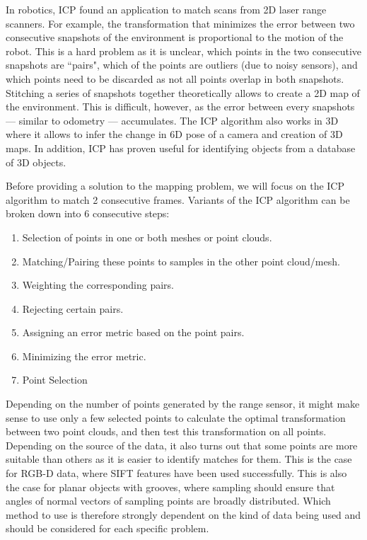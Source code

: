 \documentclass[paper=6.14in:9.21in,pagesize=pdftex,11pt,twoside,openright]{scrbook}
\begin{document}
In robotics, ICP found an application to match scans from 2D laser range scanners. For example, the transformation that minimizes the error between two consecutive snapshots of the environment is proportional to the motion of the robot. This is a hard problem as it is unclear, which points in the two consecutive snapshots are ``pairs", which of the points are outliers (due to noisy sensors), and which points need to be discarded as not all points overlap in both snapshots. Stitching a series of snapshots together theoretically allows to create a 2D map of the environment. This is difficult, however, as the error between every snapshots --- similar to odometry --- accumulates.   The ICP algorithm also works in 3D where it allows to infer the change in 6D pose of a camera and creation of 3D maps. In addition, ICP has proven useful for identifying objects from a database of 3D objects.

Before providing a solution to the mapping problem, we will focus on the ICP algorithm to match 2 consecutive frames. Variants of the ICP algorithm can be broken down into 6 consecutive steps:
\begin{enumerate}
\item Selection of points in one or both meshes or point clouds.
\item Matching/Pairing these points to samples in the other point cloud/mesh.
\item Weighting the corresponding pairs.
\item Rejecting certain pairs.
\item Assigning an error metric based on the point pairs.
\item Minimizing the error metric.
\item Point Selection
\end{enumerate}
Depending on the number of points generated by the range sensor, it might make sense to use only a few selected points to calculate the optimal transformation between two point clouds, and then test this transformation on all points. Depending on the source of the data, it also turns out that some points are more suitable than others as it is easier to identify matches for them. This is the case for RGB-D data, where SIFT features have been used successfully. This is also the case for planar objects with grooves, where sampling should ensure that angles of normal vectors of sampling points are broadly distributed. Which method to use is therefore strongly dependent on the kind of data being used and should be considered for each specific problem.
\end{document}
